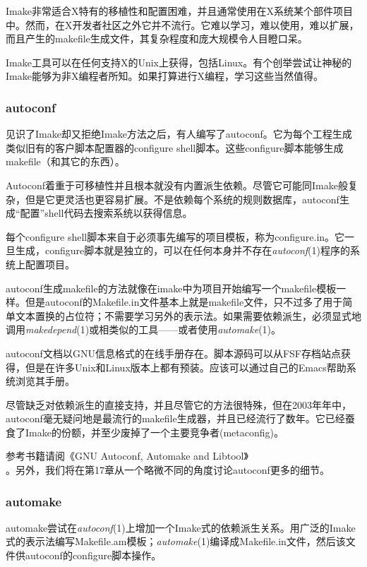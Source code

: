 \documentclass[12pt,oneside]{book}
\begin{document}
Imake非常适合X特有的移植性和配置困难，并且通常使用在X系统某个部件项目中。然而，在X开发者社区之外它并不流行。它难以学习，难以使用，难以扩展，而且产生的makefile生成文件，其复杂程度和庞大规模令人目瞪口呆。

Imake工具可以在任何支持X的Unix上获得，包括Linux。有个创举\cite{DuBois}尝试让神秘的Imake能够为非X编程者所知。如果打算进行X编程，学习这些当然值得。

\subsubsection{autoconf}
见识了Imake却又拒绝Imake方法之后，有人编写了autoconf。它为每个工程生成类似旧有的客户脚本配置器的configure shell脚本。这些configure脚本能够生成makefile（和其它的东西）。

Autoconf着重于可移植性并且根本就没有内置派生依赖。尽管它可能同Imake般复杂，但是它更灵活也更容易扩展。不是依赖每个系统的规则数据库，autoconf生成“配置”shell代码去搜索系统以获得信息。

每个configure shell脚本来自于必须事先编写的项目模板，称为configure.in。它一旦生成，configure脚本就是独立的，可以在任何本身并不存在\textit{autoconf}(1)程序的系统上配置项目。

autoconf生成makefile的方法就像在imake中为项目开始编写一个makefile模板一样。但是autoconf的Makefile.in文件基本上就是makefile文件，只不过多了用于简单文本置换的占位符；不需要学习另外的表示法。如果需要依赖派生，必须显式地调用\textit{makedepend}(1)或相类似的工具——或者使用\textit{automake}(1)。

autoconf文档以GNU信息格式的在线手册存在。脚本源码可以从FSF存档站点获得，但是在许多Unix和Linux版本上都有预装。应该可以通过自己的Emacs帮助系统浏览其手册。

尽管缺乏对依赖派生的直接支持，并且尽管它的方法很特殊，但在2003年年中，autoconf毫无疑问地是最流行的makefile生成器，并且已经流行了数年。它已经蚕食了Imake的份额，并至少废掉了一个主要竞争者(metaconfig)。

参考书籍请阅《GNU Autoconf, Automake and Libtool》\\ \cite{Vaughan}。另外，我们将在第17章从一个略微不同的角度讨论autoconf更多的细节。

\subsubsection{automake}
automake尝试在\textit{autoconf}(1)上增加一个Imake式的依赖派生关系。用广泛的Imake式的表示法编写Makefile.am模板；\textit{automake}(1)编译成Makefile.in文件，然后该文件供autoconf的configure脚本操作。
\end{document}
